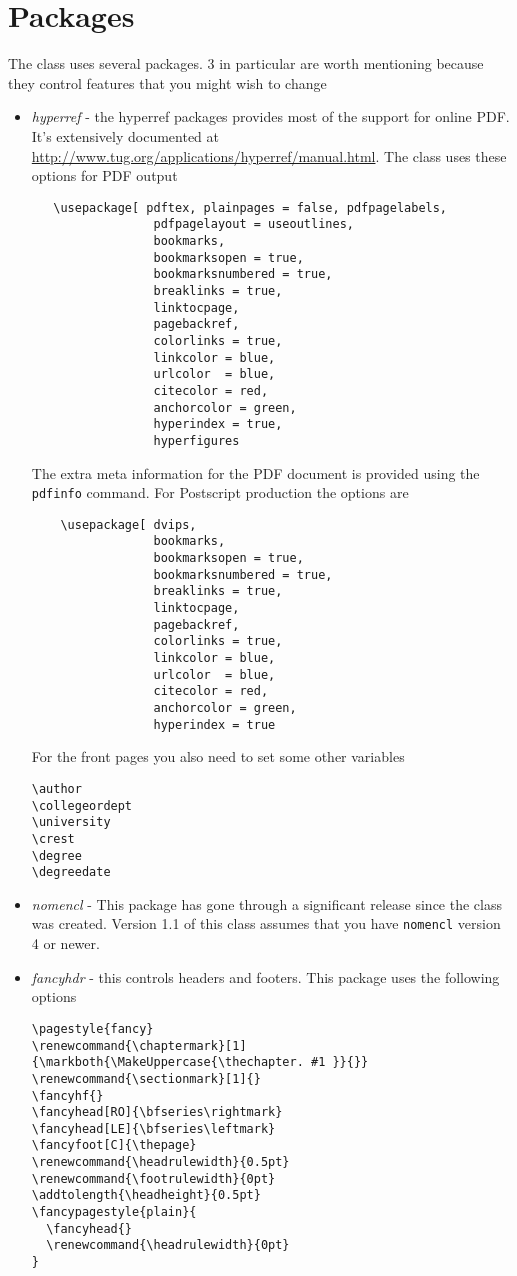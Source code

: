 \documentclass{article}
\begin{document}
\section{Packages}
The class uses several packages. 3 in particular are worth mentioning
because they control features that you might wish to change
\begin{itemize}
\item \textit{hyperref} - the hyperref packages provides most of 
the support for online PDF. It's extensively documented at \url{http://www.tug.org/applications/hyperref/manual.html}.
The class uses these options for PDF output
\begin{verbatim}
   \usepackage[ pdftex, plainpages = false, pdfpagelabels,
                 pdfpagelayout = useoutlines,
                 bookmarks,
                 bookmarksopen = true,
                 bookmarksnumbered = true,
                 breaklinks = true,
                 linktocpage,
                 pagebackref,
                 colorlinks = true,
                 linkcolor = blue,
                 urlcolor  = blue,
                 citecolor = red,
                 anchorcolor = green,
                 hyperindex = true,
                 hyperfigures
\end{verbatim}
The extra meta information for the PDF document is provided using
the \verb|pdfinfo| command. For Postscript production the options are

\begin{verbatim}
    \usepackage[ dvips,
                 bookmarks,
                 bookmarksopen = true,
                 bookmarksnumbered = true,
                 breaklinks = true,
                 linktocpage,
                 pagebackref,
                 colorlinks = true,
                 linkcolor = blue,
                 urlcolor  = blue,
                 citecolor = red,
                 anchorcolor = green,
                 hyperindex = true
\end{verbatim}

For the front pages you also need to set some other variables
\begin{verbatim}
\author
\collegeordept
\university
\crest
\degree
\degreedate
\end{verbatim}


\item \textit{nomencl} -
This package has gone through a significant release since the class was created.
Version 1.1 of this class assumes that you have \texttt{nomencl} version 4 or newer.

\item \textit{fancyhdr} - this controls headers and footers. This
package uses the following options
\begin{verbatim}
\pagestyle{fancy}
\renewcommand{\chaptermark}[1]{\markboth{\MakeUppercase{\thechapter. #1 }}{}}
\renewcommand{\sectionmark}[1]{}
\fancyhf{}
\fancyhead[RO]{\bfseries\rightmark}
\fancyhead[LE]{\bfseries\leftmark}
\fancyfoot[C]{\thepage}
\renewcommand{\headrulewidth}{0.5pt}
\renewcommand{\footrulewidth}{0pt}
\addtolength{\headheight}{0.5pt}
\fancypagestyle{plain}{
  \fancyhead{}
  \renewcommand{\headrulewidth}{0pt}
}
\end{verbatim}
\end{itemize}
\end{document}
